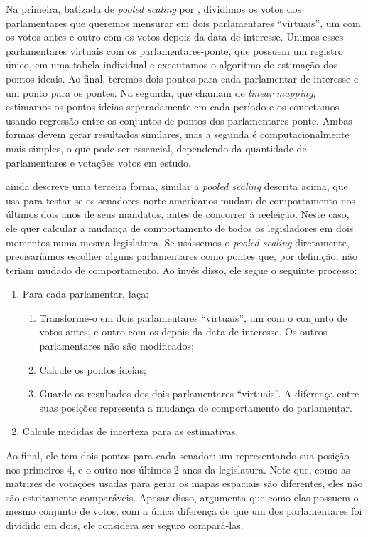 \documentclass[a4paper,titlepage]{ppgi}\usepackage[]{graphicx}\usepackage[]{color}
\begin{document}
Na primeira, batizada de \emph{pooled scaling} por ,
dividimos os votos dos parlamentares que queremos mensurar em dois
parlamentares ``virtuais'', um com os votos antes e outro com os votos depois
da data de interesse. Unimos esses parlamentares virtuais com os
parlamentares-ponte, que possuem um registro único, em uma tabela individual e
executamos o algoritmo de estimação dos pontos ideais. Ao final, teremos dois
pontos para cada parlamentar de interesse e um ponto para os pontes. Na
segunda, que  chamam de \emph{linear mapping}, estimamos
os pontos ideias separadamente em cada período e os conectamos usando regressão
entre os conjuntos de pontos dos parlamentares-ponte. Ambas formas devem gerar
resultados similares, mas a segunda é computacionalmente mais simples, o que
pode ser essencial, dependendo da quantidade de parlamentares e votações votos
em estudo.

 ainda descreve uma terceira forma, similar a
\emph{pooled scaling} descrita acima, que usa para testar se os senadores
norte-americanos mudam de comportamento nos últimos dois anos de seus mandatos,
antes de concorrer à reeleição. Neste caso, ele quer calcular a mudança de
comportamento de todos os legisladores em dois momentos numa mesma legislatura.
Se usássemos o \emph{pooled scaling} diretamente, precisaríamos escolher alguns
parlamentares como pontes que, por definição, não teriam mudado de
comportamento. Ao invés disso, ele segue o seguinte processo:

\begin{enumerate}
  \item Para cada parlamentar, faça:
    \begin{enumerate}
      \item Transforme-o em dois parlamentares ``virtuais'', um com o conjunto
de votos antes, e outro com os depois da data de interesse. Os outros
parlamentares não são modificados;
      \item Calcule os pontos ideias;
      \item Guarde os resultados dos dois parlamentares ``virtuais''. A
diferença entre suas posições representa a mudança de comportamento do
parlamentar.
    \end{enumerate}
  \item Calcule medidas de incerteza para as estimativas.
\end{enumerate}

Ao final, ele tem dois pontos para cada senador: um representando sua posição
nos primeiros 4, e o outro nos últimos 2 anos da legislatura. Note que, como as
matrizes de votações usadas para gerar os mapas espaciais são diferentes, eles
não são estritamente comparáveis. Apesar disso, 
argumenta que como elas possuem o mesmo conjunto de votos, com a única
diferença de que um dos parlamentares foi dividido em dois, ele considera ser
seguro compará-las.
\end{document}
